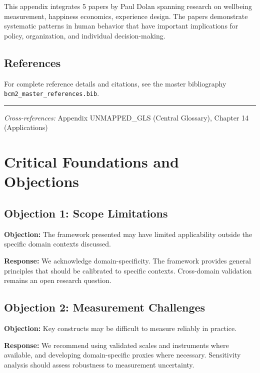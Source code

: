 This appendix integrates 5 papers by Paul Dolan
spanning research on wellbeing measurement, happiness economics, experience design.
The papers demonstrate systematic patterns in human behavior that have important
implications for policy, organization, and individual decision-making.

\subsection{References}

For complete reference details and citations, see the master bibliography
\texttt{bcm2\_master\_references.bib}.

\vspace{1em}
\hrule
\vspace{0.5em}

\noindent\textit{Cross-references:}
Appendix UNMAPPED_GLS (Central Glossary), Chapter 14 (Applications)



\section{Critical Foundations and Objections}
\label{sec:dol-foundations}

\subsection{Objection 1: Scope Limitations}

\textbf{Objection:} The framework presented may have limited applicability
outside the specific domain contexts discussed.

\textbf{Response:} We acknowledge domain-specificity. The framework provides
general principles that should be calibrated to specific contexts. Cross-domain
validation remains an open research question.

\subsection{Objection 2: Measurement Challenges}

\textbf{Objection:} Key constructs may be difficult to measure reliably in
practice.

\textbf{Response:} We recommend using validated scales and instruments where
available, and developing domain-specific proxies where necessary. Sensitivity
analysis should assess robustness to measurement uncertainty.



